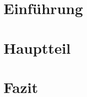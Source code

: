 \section{Einführung}\label{sec:intro}
% 


\newpage
\section{Hauptteil}\label{sec:main}
% 

\newpage
\section{Fazit}\label{sec:conclusion}
% 
